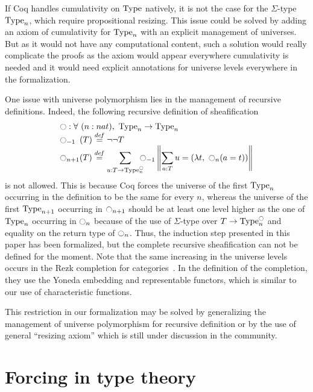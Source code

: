 %
If Coq handles cumulativity on $\operatorname{Type}$ natively, it is not
the case for the $\Sigma$-type $\operatorname{Type}_n$, which require propositional
resizing. 
%
This issue could be solved by adding an axiom of cumulativity
for $\operatorname{Type}_n$ with an explicit management of universes. 
%
But as it would not have any computational content, such a solution
would really complicate the proofs as the axiom would appear
everywhere cumulativity is needed and it would need explicit
annotations for universe levels everywhere in the formalization.
%

One issue with universe polymorphism lies in the management of
recursive definitions. Indeed, the following recursive definition of
sheafification
%
\[ \begin{array}{l}
   \ocircle : \forall \ (n : nat), \ \operatorname{Type}_n \to \operatorname{Type}_n 
   \\
    \ocircle_{-1\phantom{n}}(T) \overset{de\hspace{-0.2ex}f}{=}\lnot\lnot T \\

      \displaystyle{\ensuremath{\ocircle}_{n+1}(T)} \overset{de\hspace{-0.2ex}f}{=}  
      \displaystyle{\sum_{u:T \to \operatorname{Type}_n^{\ensuremath{\ocircle}}} \!\!\!\!\ensuremath{\ocircle}_{-1} 
      \left\|
      \sum_{a:T} u= (\lambda t,~\ensuremath{\ocircle}_n (a=t))
      \right\|}
    \end{array}
\]
%
is not allowed. 
%
This is because Coq forces the universe of the first $\operatorname{Type}_n$
occurring in the definition to be the same for every $n$, whereas the
universe of the first $\operatorname{Type}_{n+1}$ occurring in $\ocircle_{n+1}$ should be at
least one level higher as the one of $\operatorname{Type}_n$ occurring in
$\ocircle_{n}$ because of the use of $\Sigma$-type over
$T \to \operatorname{Type}_n^{\ocircle}$ and equality on the return type of $\ocircle_n$.
%
%
Thus, the induction step presented in this paper has been formalized,
but the complete recursive sheafification can not be defined for the
moment.
%
Note that the same increasing in the universe levels occurs in the
Rezk completion for categories~\cite{rezk}. In the definition of the
completion, they use the Yoneda embedding and representable functors,
which is similar to our use of characteristic functions.
 
%
This restriction in our formalization may be solved by
generalizing the management of universe polymorphism for recursive definition
%
or by the use of general ``resizing axiom'' which is still under
discussion in the community.


\section{Forcing in type theory}
\label{sec:forcing}

